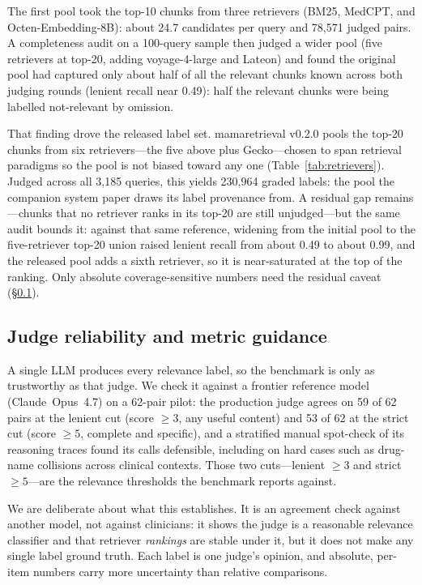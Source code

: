 The first pool took the top-10 chunks from three retrievers (BM25, MedCPT, and
Octen-Em\-bedding-8B): about 24.7 candidates per query and 78{,}571 judged pairs. A
completeness audit on a 100-query sample then judged a wider pool (five
retrievers at top-20, adding voyage-4-large and Lateon) and found the original
pool had captured only about half of all the relevant chunks known across both
judging rounds (lenient recall near 0.49): half the relevant chunks were being
labelled not-relevant by omission.

That finding drove the released label set. mamaretrieval v0.2.0 pools the top-20
chunks from six retrievers---the five above plus Gecko---chosen to span retrieval
paradigms so the pool is not biased toward any one
(Table~\ref{tab:retrievers}). Judged across all 3{,}185 queries, this yields
230{,}964 graded labels: the pool the companion system paper draws its label
provenance from. A residual gap remains---chunks that no retriever ranks in its top-20 are still
unjudged---but the same audit bounds it: against that same reference, widening
from the initial pool to the five-retriever top-20 union raised lenient recall
from about 0.49 to about 0.99, and the released pool adds a sixth retriever, so
it is near-saturated at the top of the ranking. Only absolute coverage-sensitive
numbers need the residual caveat (\S\ref{sec:mr-judge}).

\subsection{Judge reliability and metric guidance}
\label{sec:mr-judge}

A single LLM produces every relevance label, so the benchmark is only as
trustworthy as that judge. We check it against a frontier reference model
(Claude~Opus~4.7) on a 62-pair pilot: the production judge agrees on 59 of 62
pairs at the lenient cut (score $\ge 3$, any useful content) and 53 of 62 at the
strict cut (score $\ge 5$, complete and specific), and a stratified manual
spot-check of its reasoning traces found its calls defensible, including on hard
cases such as drug-name collisions across clinical contexts. Those two
cuts---lenient $\ge 3$ and strict $\ge 5$---are the relevance thresholds the
benchmark reports against.

We are deliberate about what this establishes. It is an agreement check against
another model, not against clinicians: it shows the judge is a reasonable
relevance classifier and that retriever \emph{rankings} are stable under it, but
it does not make any single label ground truth. Each label is one judge's
opinion, and absolute, per-item numbers carry more uncertainty than relative
comparisons.

